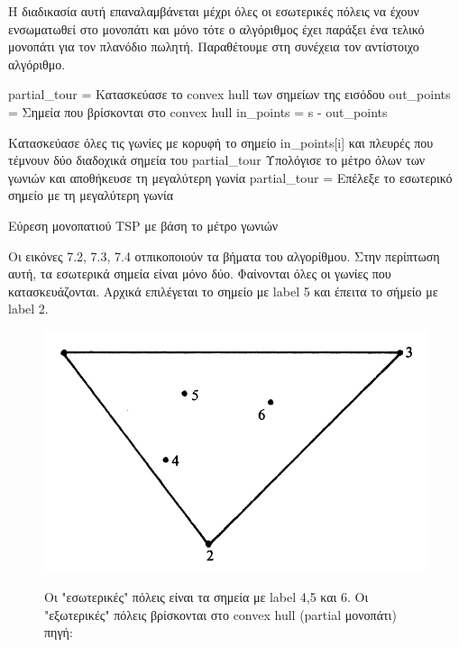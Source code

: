 \documentclass[oneside,12pt]{book}
\newenvironment{matlab}
	{\begin{figure}[hp]\centering\captionsetup{justification=centering}}
	{\end{figure}}
\theoremstyle{definition}
\begin{document}
Η διαδικασία αυτή επαναλαμβάνεται μέχρι όλες οι εσωτερικές πόλεις να έχουν ενσωματωθεί στο μονοπάτι και μόνο τότε ο αλγόριθμος έχει παράξει ένα τελικό μονοπάτι για τον πλανόδιο πωλητή. Παραθέτουμε στη συνέχεια τον αντίστοιχο αλγόριθμο. \\

\begin{algorithm}[H]
	\SetAlgoLined

	partial\_tour = Κατασκεύασε το convex hull των σημείων της εισόδου \;
	out\_points = Σημεία που βρίσκονται στο convex hull \;
	in\_points = s - out\_points \;

	{
		{
			Κατασκεύασε όλες τις γωνίες με κορυφή το σημείο in\_points[i] και πλευρές που τέμνουν δύο διαδοχικά σημεία του partial\_tour \;
			Υπολόγισε το μέτρο όλων των γωνιών και αποθήκευσε τη μεγαλύτερη γωνία \;
		}
		partial\_tour = Επέλεξε το εσωτερικό σημείο με τη μεγαλύτερη γωνία \;
	}

	\caption{Εύρεση μονοπατιού TSP με βάση το μέτρο γωνιών}
\end{algorithm}

Οι εικόνες 7.2, 7.3, 7.4 οτπικοποιούν τα βήματα του αλγορίθμου. Στην περίπτωση αυτή, τα εσωτερικά σημεία είναι μόνο δύο. Φαίνονται όλες οι γωνίες που κατασκευάζονται. Αρχικά επιλέγεται το σημείο με label 5 και έπειτα το σήμείο με label 2. \\

\begin{matlab}
	\includegraphics[scale=0.5]{images/geometric_approach_angle1.png}
	\caption{Οι "εσωτερικές" πόλεις είναι τα σημεία με label 4,5 και 6. Οι "εξωτερικές" πόλεις βρίσκονται στο convex hull (partial μονοπάτι)\\ πηγή: \cite{16}}
\end{matlab}
\end{document}
